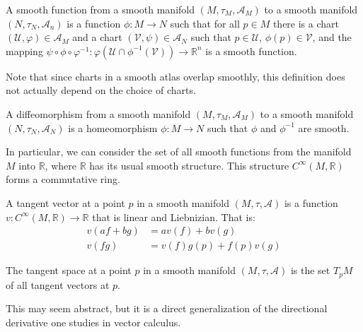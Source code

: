 \documentclass{article}                                                        %
\begin{document}
        \begin{definition}
            A smooth function from a smooth manifold
            $(M,\tau_{M},\mathcal{A}_{M})$ to a smooth manifold
            $(N,\tau_{N},\mathcal{A}_{n})$ is a function $\phi:M\rightarrow{N}$
            such that for all $p\in{M}$ there is a chart
            $(\mathcal{U},\varphi)\in\mathcal{A}_{M}$ and a chart
            $(\mathcal{V},\psi)\in\mathcal{A}_{N}$ such that $p\in\mathcal{U}$,
            $\phi(p)\in\mathcal{V}$, and the mapping
            $\psi\circ\phi\circ\varphi^{\minus{1}}:%
             \varphi(\mathcal{U}\cap\phi^{\minus{1}}(\mathcal{V}))%
             \rightarrow\mathbb{R}^{n}$ is a smooth function.
        \end{definition}
        Note that since charts in a smooth atlas overlap smoothly, this
        definition does not actually depend on the choice of charts.
        \begin{definition}
            A diffeomorphism from a smooth manifold
            $(M,\tau_{M},\mathcal{A}_{M})$ to a smooth manifold
            $(N,\tau_{N},\mathcal{A}_{N})$ is a homeomorphism
            $\phi:M\rightarrow{N}$ such that $\phi$ and $\phi^{\minus{1}}$ are
            smooth.
        \end{definition}
        In particular, we can consider the set of all smooth functions
        from the manifold $M$ into $\mathbb{R}$, where $\mathbb{R}$ has its
        usual smooth structure. This structure $C^{\infty}(M,\mathbb{R})$ forms
        a commutative ring.
        \begin{definition}
            A tangent vector at a point $p$ in a smooth manifold
            $(M,\tau,\mathcal{A})$ is a function
            $v:C^{\infty}(M,\mathbb{R})\rightarrow\mathbb{R}$ that is linear and
            Liebnizian. That is:
            \begin{align}
                v(af+bg)&=av(f)+bv(g)\tag{Linearity}\\
                v(fg)&=v(f)g(p)+f(p)v(g)\tag{Liebnizian}
            \end{align}
        \end{definition}
        \begin{definition}
            The tangent space at a point $p$ in a smooth manifold
            $(M,\tau,\mathcal{A})$ is the set $T_{p}M$ of all tangent vectors
            at $p$.
        \end{definition}
        This may seem abstract, but it is a direct generalization of the
        directional derivative one studies in vector calculus.
\end{document}
